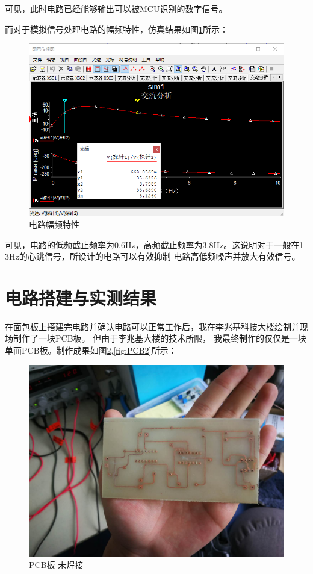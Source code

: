 \documentclass{article}
\begin{document}
\begin{spacing}{1.5}
    可见，此时电路已经能够输出可以被MCU识别的数字信号。

    而对于模拟信号处理电路的幅频特性，仿真结果如图\ref{fig:sim1_result4}所示：
    \begin{figure}[H]
        \centering
        \includegraphics[scale=0.3]{fig/sim/sim1_result4.png}
        \caption{电路幅频特性}
        \label{fig:sim1_result4}
    \end{figure}

    可见，电路的低频截止频率为0.6Hz，高频截止频率为3.8Hz。这说明对于一般在1-3Hz的心跳信号，所设计的电路可以有效抑制
    电路高低频噪声并放大有效信号。

\section{电路搭建与实测结果}

    在面包板上搭建完电路并确认电路可以正常工作后，我在李兆基科技大楼绘制并现场制作了一块PCB板。
    但由于李兆基大楼的技术所限，
    我最终制作的仅仅是一块单面PCB板。制作成果如图\ref{fig:PCB1},\ref{fig:PCB2}所示：

    \begin{figure}[H]
        \centering
        \includegraphics[scale=0.1]{fig/result/PCB1.png}
        \caption{PCB板-未焊接}
        \label{fig:PCB1}
    \end{figure}


\end{spacing}
\end{document}
